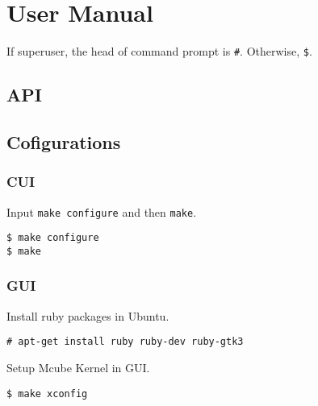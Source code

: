 \section{User Manual}

If superuser, the head of command prompt is \verb|#|.
Otherwise, \verb|$|.


\subsection{API}


\subsection{Cofigurations}

\subsubsection{CUI}

Input \verb|make configure| and then \verb|make|.

\noindent
\begin{Sbox}
\begin{minipage}[t]{0.975\linewidth}
\begin{verbatim}
$ make configure
$ make
\end{verbatim}
\end{minipage}
\end{Sbox}
\fbox{\TheSbox}


\subsubsection{GUI}


Install ruby packages in Ubuntu.


\noindent
\begin{Sbox}
\begin{minipage}[t]{0.975\linewidth}
\begin{verbatim}
# apt-get install ruby ruby-dev ruby-gtk3 
\end{verbatim}
\end{minipage}
\end{Sbox}
\fbox{\TheSbox}


Setup Mcube Kernel in GUI.

\noindent
\begin{Sbox}
\begin{minipage}[t]{0.975\linewidth}
\begin{verbatim}
$ make xconfig
\end{verbatim}
\end{minipage}
\end{Sbox}
\fbox{\TheSbox}


